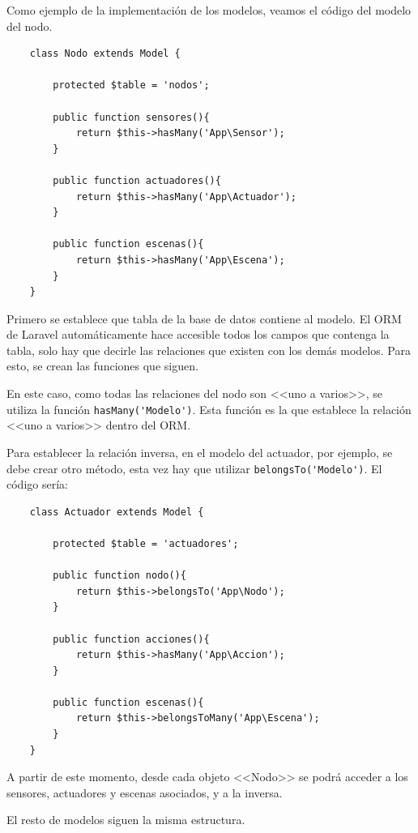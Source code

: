     Como ejemplo de la implementación de los modelos, veamos el código del modelo del nodo.
    
    \begin{lstlisting}
    class Nodo extends Model {
    
        protected $table = 'nodos';
    
        public function sensores(){
            return $this->hasMany('App\Sensor');
        }
    
        public function actuadores(){
            return $this->hasMany('App\Actuador');
        }
    
        public function escenas(){
            return $this->hasMany('App\Escena');
        }
    }
    \end{lstlisting}
    
    Primero se establece que tabla de la base de datos contiene al modelo. El ORM de Laravel automáticamente hace accesible todos los campos que contenga la tabla, solo hay que decirle las relaciones que existen con los demás modelos. Para esto, se crean las funciones que siguen.
    
    En este caso, como todas las relaciones del nodo son <<uno a varios>>, se utiliza la función \lstinline|hasMany('Modelo')|. Esta función es la que establece la relación <<uno a varios>> dentro del ORM.
    
    Para establecer la relación inversa, en el modelo del actuador, por ejemplo, se debe crear otro método, esta vez hay que utilizar \lstinline|belongsTo('Modelo')|. El código sería:
    \begin{lstlisting}
    class Actuador extends Model {
    
        protected $table = 'actuadores';
        
        public function nodo(){
            return $this->belongsTo('App\Nodo');
        }
        
        public function acciones(){
            return $this->hasMany('App\Accion');
        }
        
        public function escenas(){
            return $this->belongsToMany('App\Escena');
        }
    }
    \end{lstlisting}
    
    A partir de este momento, desde cada objeto <<Nodo>> se podrá acceder a los sensores, actuadores y escenas asociados, y  a la inversa.
    
    El resto de modelos siguen la misma estructura.
    
